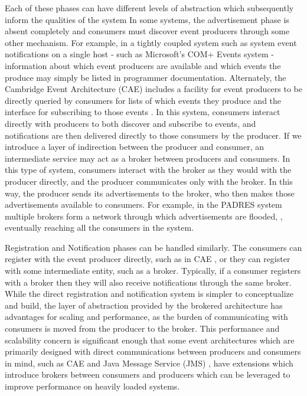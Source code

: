 \documentclass{acm_proc_article-sp}
\begin{document}
Each of these phases can have different levels of abstraction which subsequently inform the qualities of the system In some systems, the advertisement phase is absent completely and consumers must discover event producers through some other mechanism. For example, in a tightly coupled system such as system event notifications on a single host - such as Microsoft's COM+ Events system - information about which event producers are available and which events the produce may simply be listed in programmer documentation. Alternately, the Cambridge Event Architecture (CAE) includes a facility for event producers to be directly queried by consumers for lists of which events they produce and the interface for subscribing to those events \cite{Bacon:2000p6818}. In this system, consumers interact directly with producers to both discover and subscribe to events, and notifications are then delivered directly to those consumers by the producer. If we introduce a layer of indirection between the producer and consumer, an intermediate service may act as a broker between producers and consumers. In this type of system, consumers interact with the broker as they would with the producer directly, and the producer communicates only with the broker. In this way, the producer sends its advertisements to the broker, who then makes those advertisements available to consumers. For example, in the PADRES system multiple brokers form a network through which advertisements are flooded, \cite{Jacobsen:2010p8313}, eventually reaching all the consumers in the system.

Registration and Notification phases can be handled similarly. The consumers can register with the event producer directly, such as in CAE \cite{Bacon:2000p6818}, or they can register with some intermediate entity, such as a broker. Typically, if a consumer registers with a broker then they will also receive notifications through the same broker. While the direct registration and notification system is simpler to conceptualize and build, the layer of abstraction provided by the brokered architecture has advantages for scaling and performance, as the burden of communicating with consumers is moved from the producer to the broker. This performance and scalability concern is significant enough that some event architectures which are primarily designed with direct communications between producers and consumers in mind, such as CAE \cite{Bacon:2000p6818} and Java Message Service (JMS) \cite{Oracle:2002p8432}, have extensions which introduce brokers between consumers and producers which can be leveraged to improve performance on heavily loaded systems.
\end{document}
